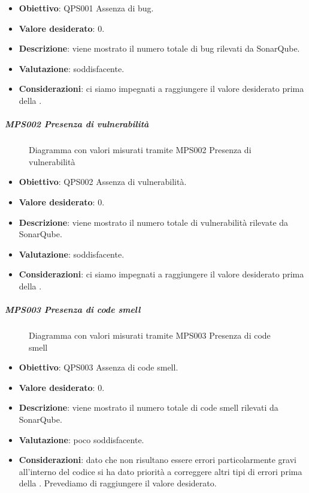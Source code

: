 	\begin{itemize}
		\item \textbf{Obiettivo}: QPS001 Assenza di bug.
		\item \textbf{Valore desiderato}: 0.
		\item \textbf{Descrizione}: viene mostrato il numero totale di bug rilevati da SonarQube.
		\item \textbf{Valutazione}: soddisfacente.
		\item \textbf{Considerazioni}: ci siamo impegnati a raggiungere il valore desiderato prima della \RQ.
	\end{itemize}
	
	\subparagraph{MPS002 Presenza di vulnerabilità}
	
	\begin{figure}[H]
		\centering
		\label{immaginePresenzaVulnerabilitàRP}
		\caption{Diagramma con valori misurati tramite MPS002 Presenza di vulnerabilità}
	\end{figure}
	
	\begin{itemize}
		\item \textbf{Obiettivo}: QPS002 Assenza di vulnerabilità.
		\item \textbf{Valore desiderato}: 0.
		\item \textbf{Descrizione}: viene mostrato il numero totale di vulnerabilità rilevate da SonarQube.
		\item \textbf{Valutazione}: soddisfacente.
		\item \textbf{Considerazioni}: ci siamo impegnati a raggiungere il valore desiderato prima della \RQ.
	\end{itemize}
	
	\subparagraph{MPS003 Presenza di code smell}
	
	\begin{figure}[H]
		\centering
		\label{immaginePresenzaCodeSmellRP}
		\caption{Diagramma con valori misurati tramite MPS003 Presenza di code smell}
	\end{figure}
	
	\begin{itemize}
		\item \textbf{Obiettivo}: QPS003 Assenza di code smell.
		\item \textbf{Valore desiderato}: 0.
		\item \textbf{Descrizione}: viene mostrato il numero totale di code smell rilevati da SonarQube.
		\item \textbf{Valutazione}: poco soddisfacente.
		\item \textbf{Considerazioni}: dato che non risultano essere errori particolarmente gravi all'interno del codice si ha dato priorità a correggere altri tipi di errori prima della \RQ. Prevediamo di raggiungere il valore
		desiderato.
	\end{itemize}
	
